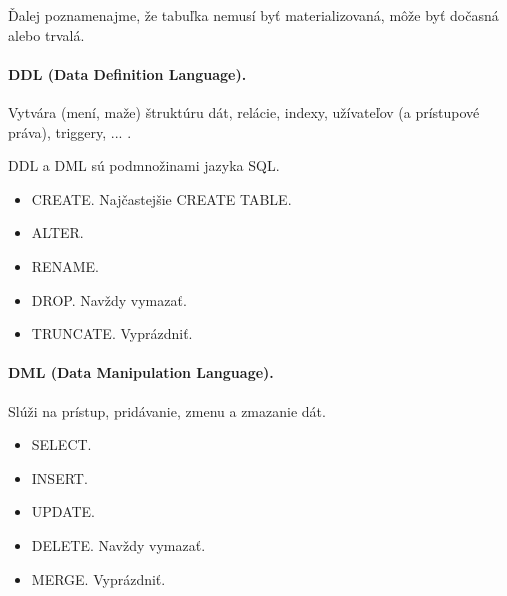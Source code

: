 \documentclass[10pt,a4paper]{article}
\begin{document}
Ďalej poznamenajme, že tabuľka nemusí byť materializovaná, môže byť dočasná alebo trvalá. 

\paragraph{DDL (Data Definition Language).}
Vytvára (mení, maže) štruktúru dát, relácie, indexy, užívateľov (a prístupové práva), triggery, ... . 

DDL a DML sú podmnožinami jazyka SQL. 

\begin{itemize}
\item CREATE. Najčastejšie CREATE TABLE.
\item ALTER. 
\item RENAME.
\item DROP. Navždy vymazať. 
\item TRUNCATE. Vyprázdniť. 
\end{itemize}

\paragraph{DML (Data Manipulation Language).}
Slúži na prístup, pridávanie, zmenu a zmazanie dát. 

\begin{itemize}
\item SELECT. 
\item INSERT. 
\item UPDATE.
\item DELETE. Navždy vymazať. 
\item MERGE. Vyprázdniť. 
\end{itemize}
\end{document}
